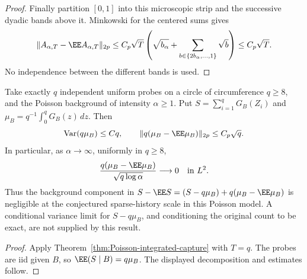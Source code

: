 \documentclass[11pt,letterpaper]{article}
\begin{document}
\begin{proof}
Finally partition $[0,1]$ into this microscopic strip and
the successive dyadic bands above it. Minkowski for the
centered sums gives
\[
 \|A_{\alpha,T}-\EE A_{\alpha,T}\|_{2p}
       \le C_p\sqrt T\left(\sqrt{b_\alpha}
                      +\sum_{b\in\{2b_\alpha,\ldots,1\}}\sqrt b\right)
       \le C_p\sqrt T.
\]
No independence between the different bands is used.
\end{proof}

\begin{corollary}
\label{cor:Poisson-capture-background-mean}
Take exactly $q$ independent uniform probes on a circle of
circumference $q\ge8$, and the Poisson background of intensity
$\alpha\ge1$. Put $S=\sum_{i=1}^qG_B(Z_i)$ and
$\mu_B=q^{-1}\int_0^qG_B(z)\,dz$. Then
\[
 \operatorname{Var}(q\mu_B)\le Cq,\qquad
 \|q(\mu_B-\EE\mu_B)\|_{2p}\le C_p\sqrt q.
\]
In particular, as $\alpha\to\infty$, uniformly in $q\ge8$,
\[
 \frac{q(\mu_B-\EE\mu_B)}{\sqrt{q\log\alpha}}
                   \longrightarrow0\quad\hbox{in }L^2.
\]
Thus the background component in
$S-\EE S=(S-q\mu_B)+q(\mu_B-\EE\mu_B)$ is negligible
at the conjectured sparse-history scale in this Poisson model.
A conditional variance limit for $S-q\mu_B$, and conditioning
the original count to be exact, are not supplied by this result.
\end{corollary}
\begin{proof}
Apply Theorem~\ref{thm:Poisson-integrated-capture} with $T=q$.
The probes are iid given $B$, so $\EE(S\mid B)=q\mu_B$.
The displayed decomposition and estimates follow.
\end{proof}
\end{document}
